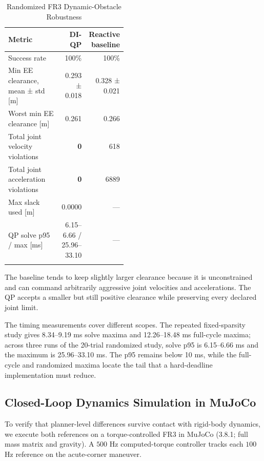 {%
\begin{table}[t]
\caption{Randomized FR3 Dynamic-Obstacle Robustness}
\label{tab:fr3-randomized}
\centering
\footnotesize
\setlength{\tabcolsep}{3pt}
\begin{tabular}{@{}>{\raggedright\arraybackslash}p{0.46\linewidth}rr@{}}
\toprule\noalign{}
Metric & DI-QP & Reactive baseline \\
\midrule\noalign{}
Success rate & 100\% & 100\% \\
Min EE clearance, mean ± std {[}m{]} & 0.293 ± 0.018 & 0.328 ± 0.021 \\
Worst min EE clearance {[}m{]} & 0.261 & 0.266 \\
Total joint velocity violations & \textbf{0} & 618 \\
Total joint acceleration violations & \textbf{0} & 6889 \\
Max slack used {[}m{]} & 0.0000 & --- \\
QP solve p95 / max {[}ms{]} & 6.15--6.66 / 25.96--33.10 & --- \\
\bottomrule\noalign{}
\end{tabular}
\end{table}
}

The baseline tends to keep slightly larger clearance because it is
unconstrained and can command arbitrarily aggressive joint velocities
and accelerations. The QP accepts a smaller but still positive clearance
while preserving every declared joint limit.

The timing measurements cover different scopes. The repeated fixed-sparsity
study gives 8.34--9.19 ms solve maxima and 12.26--18.48 ms full-cycle maxima;
across three runs of the 20-trial randomized study, solve p95 is
6.15--6.66 ms and the maximum is 25.96--33.10 ms. The p95 remains below
10 ms, while the full-cycle and randomized maxima locate the tail that a
hard-deadline implementation must reduce.

\subsection{Closed-Loop Dynamics Simulation in
MuJoCo}\label{h.-physical-execution-in-mujoco}

To verify that planner-level differences survive contact with rigid-body
dynamics, we execute both references on a torque-controlled FR3 in
MuJoCo (3.8.1; full mass matrix and gravity). A \(500\) Hz
computed-torque controller tracks each \(100\) Hz reference on the
acute-corner maneuver.

